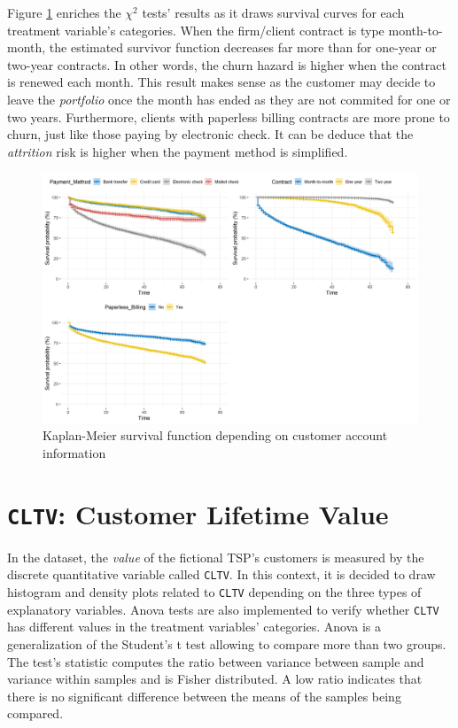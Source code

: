 \documentclass[
]{book}
\begin{document}
Figure \ref{fig:kmcustaccount} enriches the \(\chi^2\) tests' results as it draws survival curves for each treatment variable's categories. When the firm/client contract is type month-to-month, the estimated survivor function decreases far more than for one-year or two-year contracts. In other words, the churn hazard is higher when the contract is renewed each month. This result makes sense as the customer may decide to leave the \emph{portfolio} once the month has ended as they are not commited for one or two years. Furthermore, clients with paperless billing contracts are more prone to churn, just like those paying by electronic check. It can be deduce that the \emph{attrition} risk is higher when the payment method is simplified.

\begin{figure}

{\centering \includegraphics[width=50in]{./imgs/account_info_plot} 

}

\caption{Kaplan-Meier survival function depending on customer account information}\label{fig:kmcustaccount}
\end{figure}

\hypertarget{cltv-customer-lifetime-value}{%
\section{\texorpdfstring{\texttt{CLTV}: Customer Lifetime Value}{CLTV: Customer Lifetime Value}}\label{cltv-customer-lifetime-value}}

In the dataset, the \emph{value} of the fictional TSP's customers is measured by the discrete quantitative variable called \texttt{CLTV}. In this context, it is decided to draw histogram and density plots related to \texttt{CLTV} depending on the three types of explanatory variables. Anova tests are also implemented to verify whether \texttt{CLTV} has different values in the treatment variables' categories. Anova is a generalization of the Student's t test allowing to compare more than two groups. The test's statistic computes the ratio between variance between sample and variance within samples and is Fisher distributed. A low ratio indicates that there is no significant difference between the means of the samples being compared.
\end{document}
